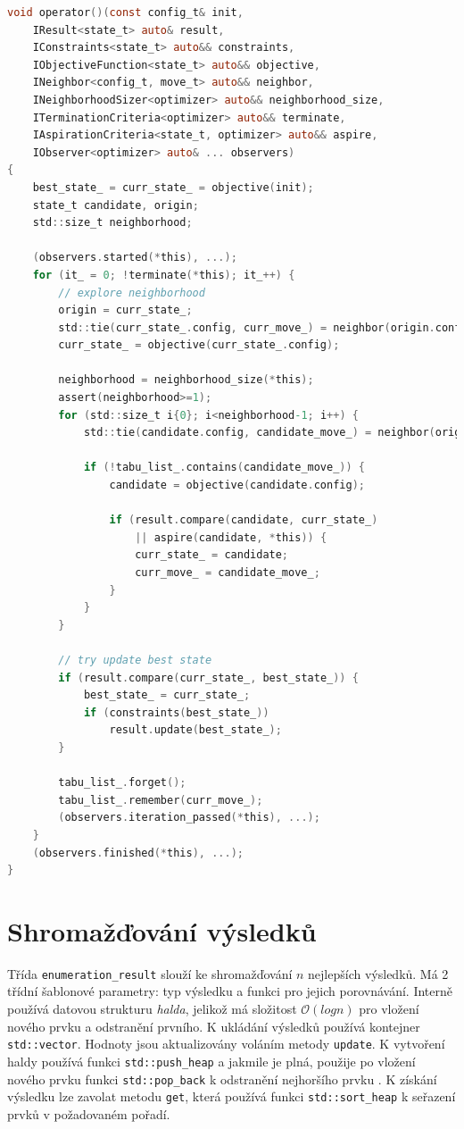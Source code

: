 \begin{lstlisting}[caption={~Implementace genetického algoritmu},label={lst:tabu:search},captionpos=t,abovecaptionskip=-\medskipamount,belowcaptionskip=\medskipamount,language=C]
void operator()(const config_t& init,
    IResult<state_t> auto& result,
    IConstraints<state_t> auto&& constraints,
    IObjectiveFunction<state_t> auto&& objective,
    INeighbor<config_t, move_t> auto&& neighbor,
    INeighborhoodSizer<optimizer> auto&& neighborhood_size,
    ITerminationCriteria<optimizer> auto&& terminate,
    IAspirationCriteria<state_t, optimizer> auto&& aspire,
    IObserver<optimizer> auto& ... observers)
{
    best_state_ = curr_state_ = objective(init);
    state_t candidate, origin;
    std::size_t neighborhood;

    (observers.started(*this), ...);
    for (it_ = 0; !terminate(*this); it_++) {
        // explore neighborhood
        origin = curr_state_;
        std::tie(curr_state_.config, curr_move_) = neighbor(origin.config);
        curr_state_ = objective(curr_state_.config);

        neighborhood = neighborhood_size(*this);
        assert(neighborhood>=1);
        for (std::size_t i{0}; i<neighborhood-1; i++) {
            std::tie(candidate.config, candidate_move_) = neighbor(origin.config);

            if (!tabu_list_.contains(candidate_move_)) {
                candidate = objective(candidate.config);

                if (result.compare(candidate, curr_state_)
                    || aspire(candidate, *this)) {
                    curr_state_ = candidate;
                    curr_move_ = candidate_move_;
                }
            }
        }

        // try update best state
        if (result.compare(curr_state_, best_state_)) {
            best_state_ = curr_state_;
            if (constraints(best_state_))
                result.update(best_state_);
        }

        tabu_list_.forget();
        tabu_list_.remember(curr_move_);
        (observers.iteration_passed(*this), ...);
    }
    (observers.finished(*this), ...);
}
\end{lstlisting}

\section{Shromažďování výsledků}
Třída \texttt{enumeration\_result} slouží ke shromažďování $n$ nejlepších výsledků.
Má 2 třídní šablonové parametry: typ výsledku a funkci pro jejich porovnávání.
Interně používá datovou strukturu \textit{halda}, jelikož má složitost $\mathcal{O}(log{}n)$ pro vložení nového prvku a odstranění prvního.
K ukládání výsledků používá kontejner \texttt{std::vector}.
Hodnoty jsou aktualizovány voláním metody \texttt{update}.
K vytvoření haldy používá funkci \texttt{std::push\_heap} a jakmile je plná, použije po vložení nového prvku funkci \texttt{std::pop\_back} k odstranění nejhoršího prvku \cite{push-heap}.
K získání výsledku lze zavolat metodu \texttt{get}, která používá funkci \texttt{std::sort\_heap} k seřazení prvků v požadovaném pořadí.

